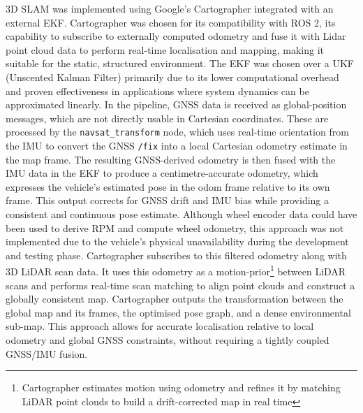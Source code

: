 \documentclass[conference]{IEEEtran}
\begin{document}
3D SLAM  was implemented using Google’s Cartographer integrated with an external EKF. Cartographer was chosen for its compatibility with ROS 2, its capability to subscribe to externally computed odometry and fuse it with Lidar point cloud data to perform real-time localisation and mapping, making it suitable for the static, structured environment. The EKF was chosen over a UKF (Unscented Kalman Filter) primarily due to its lower computational overhead and proven effectiveness in applications where system dynamics can be approximated linearly\cite{b7}.
In the pipeline, GNSS data is received as global-position messages, which are not directly usable in Cartesian coordinates. These are processed by the \texttt{navsat\_transform} node\cite{b17}, which uses real-time orientation from the IMU to convert the GNSS \texttt{/fix} into a local Cartesian odometry estimate in the map frame. 
The resulting GNSS-derived odometry is then fused with the IMU data in the EKF to produce a centimetre-accurate odometry, which expresses the vehicle’s estimated pose in the odom frame relative to its own frame. This output corrects for GNSS drift and IMU bias while providing a consistent and continuous pose estimate. Although wheel encoder data could have been used to derive RPM and compute wheel odometry, this approach was not implemented due to the vehicle's physical unavailability during the development and testing phase.
Cartographer subscribes to this filtered odometry along with 3D LiDAR scan data. It uses this odometry as a motion-prior\footnote{Cartographer estimates motion using odometry and refines it by matching LiDAR point clouds to build a drift-corrected map in real time} between LiDAR scans and performs real-time scan matching to align point clouds and construct a globally consistent map. Cartographer outputs the transformation between the global map and its frames, the optimised pose graph, and a dense environmental sub-map.
This approach allows for accurate localisation relative to local odometry and global GNSS constraints, without requiring a tightly coupled GNSS/IMU fusion.
\end{document}
